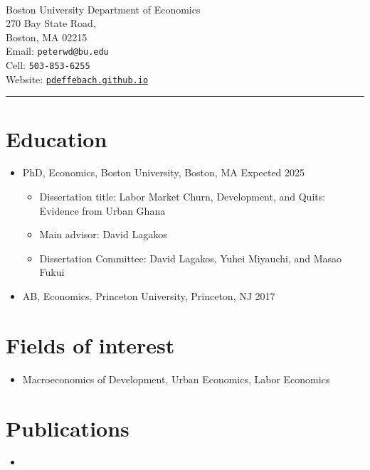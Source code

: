 \documentclass[12pt]{article}
\newenvironment{customitemize}
{ \begin{itemize}[
	leftmargin=\parindent,
	itemindent=-0.5\parindent,
	topsep = 0pt, 
	itemsep = -1pt, 
	label={}] }
{\end{itemize} }
\begin{document}
\normalsize
\singlespacing

\thispagestyle{plain}


\newcommand{\link}[2]{{\color{blue}\href{#1}{#2}}}

 \\
Boston University Department of Economics \\
270 Bay State Road, \\
Boston, MA 02215 \\
Email: \texttt{peterwd@bu.edu} \\
Cell: \texttt{503-853-6255} \\
Website: \href{https://pdeffebach.github.io/}{\texttt{pdeffebach.github.io}} \\
\rule{\textwidth}{1pt}
\section*{Education}

\begin{customitemize}
\item PhD, Economics, Boston University, Boston, MA  \hfill Expected 2025 
\begin{customitemize}
\item Dissertation title: Labor Market Churn, Development, and Quits: Evidence from Urban Ghana 
\item Main advisor: David Lagakos 
\item Dissertation Committee: David Lagakos, Yuhei Miyauchi, and Masao Fukui 
\end{customitemize}
\item AB, Economics, Princeton University, Princeton, NJ  \hfill 2017
\end{customitemize}
\section*{Fields of interest}

\begin{customitemize}
\item Macroeconomics of Development, Urban Economics, Labor Economics
\end{customitemize}


\section*{Publications}

\begin{customitemize}
	\item {}
\end{customitemize}
\end{document}
